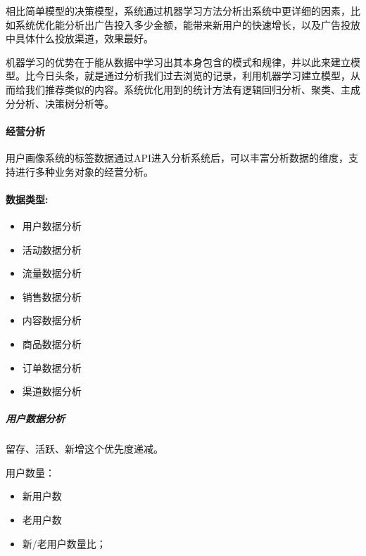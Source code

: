 \documentclass[letterpaper,11pt,english]{sphinxmanual}
\begin{document}
相比简单模型的决策模型，系统通过机器学习方法分析出系统中更详细的因素，比如系统优化能分析出广告投入多少金额，能带来新用户的快速增长，以及广告投放中具体什么投放渠道，效果最好。

机器学习的优势在于能从数据中学习出其本身包含的模式和规律，并以此来建立模型。比今日头条，就是通过分析我们过去浏览的记录，利用机器学习建立模型，从而给我们推荐类似的内容。系统优化用到的统计方法有逻辑回归分析、聚类、主成分分析、决策树分析等。


\paragraph{经营分析}
\label{\detokenize{chapter_knowledge/data_analysis:id8}}
用户画像系统的标签数据通过API进入分析系统后，可以丰富分析数据的维度，支持进行多种业务对象的经营分析。


\paragraph{数据类型:}
\label{\detokenize{chapter_knowledge/data_analysis:id9}}\begin{itemize}
\item {} 
用户数据分析

\item {} 
活动数据分析

\item {} 
流量数据分析

\item {} 
销售数据分析

\item {} 
内容数据分析

\item {} 
商品数据分析

\item {} 
订单数据分析

\item {} 
渠道数据分析

\end{itemize}


\subparagraph{用户数据分析}
\label{\detokenize{chapter_knowledge/data_analysis:id10}}
留存、活跃、新增这个优先度递减。

用户数量：
\begin{itemize}
\item {} 
新用户数

\item {} 
老用户数

\item {} 
新/老用户数量比；

\end{itemize}
\end{document}
